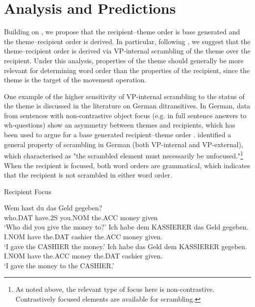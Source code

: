 \section{Analysis and Predictions}
Building on \cite{Hallman.2015}, we propose that the recipient--theme order is base generated and the theme--recipient order is derived. In particular, following \cite{Takano.1998}, we suggest that the theme--recipient order is derived via VP-internal scrambling of the theme over the recipient. Under this analysis, properties of the theme should generally be more relevant for determining word order than the properties of the recipient, since the theme is the target of the movement operation.

One example of the higher sensitivity of VP-internal scrambling to the status of the theme is discussed in the literature on German ditransitives. In German, data from sentences with non-contrastive object focus (e.g. in full sentence answers to wh-questions) show an asymmetry between themes and recipients, which has been used to argue for a base generated recipient--theme order \citep{Lenerz.1977,Abraham.1986,Webelhuth.1992,Choi.1996}. \cite{Lenerz.1977} identified a general property of scrambling in German (both VP-internal and VP-external), which \cite{Webelhuth.1992}	 characterised as "the scrambled element must necessarily be unfocused."\footnote{As noted above, the relevant type of focus here is non-contrastive. Contrastively focused elements are available for scrambling.} When the recipient is focused, both word orders are grammatical, which indicates that the recipient is not scrambled in either word order.
\begin{exe}
\ex Recipient Focus \citep[ex 12]{Choi.1996}
\begin{xlist}
\ex \gll Wem hast du das Geld gegeben?\\
who.DAT have.2S you.NOM the.ACC money given\\
\trans `Who did you give the money to?'
\ex \gll Ich habe dem KASSIERER das Geld gegeben.\\
I.NOM have the.DAT cashier the.ACC money given.\\
\trans `I gave the CASHIER the money.'
\ex \gll Ich habe das Geld dem KASSIERER gegeben.\\
I.NOM have the.ACC money the.DAT cashier given.\\
\trans `I gave the money to the CASHIER.'
\end{xlist}
\end{exe}

